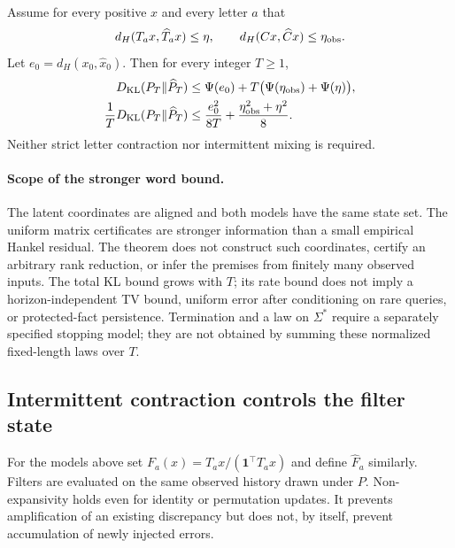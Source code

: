 \begin{theorem}
\label{II:M:thm:projective-word-kl}
Assume for every positive $x$ and every letter $a$ that
\[
 d_H(T_ax,\widehat T_ax)\le\eta,
 \qquad d_H(Cx,\widehat Cx)\le\eta_{\rm obs}.
\]
Let $e_0=d_H(x_0,\widehat x_0)$. Then for every integer $T\ge1$,
\begin{align}
 D_{\rm KL}(P_T\|\widehat P_T)
 &\le\Psi(e_0)+T\bigl(\Psi(\eta_{\rm obs})+\Psi(\eta)\bigr),
 \label{II:M:eq:word-kl-relative}\\
 \frac1T D_{\rm KL}(P_T\|\widehat P_T)
 &\le\frac{e_0^2}{8T}+\frac{\eta_{\rm obs}^2+\eta^2}{8}.
 \label{II:M:eq:word-kl-quadratic}
\end{align}
Neither strict letter contraction nor intermittent mixing is required.
\end{theorem}


\paragraph{Scope of the stronger word bound.}
The latent coordinates are aligned and both models have the same state
set. The uniform matrix certificates are stronger information than a
small empirical Hankel residual. The theorem does not construct such
coordinates, certify an arbitrary rank reduction, or infer the premises
from finitely many observed inputs. The total KL bound grows with $T$;
its rate bound does not imply a horizon-independent TV bound, uniform
error after conditioning on rare queries, or protected-fact persistence.
Termination and a law on $\Sigma^*$ require a separately specified
stopping model; they are not obtained by summing these normalized
fixed-length laws over $T$.

\subsection{Intermittent contraction controls the filter state}
For the models above set
$F_a(x)=T_ax/(\mathbf1^\top T_ax)$ and define $\widehat F_a$
similarly. Filters are evaluated on the same observed history drawn
under $P$. Non-expansivity holds even for identity or permutation
updates. It prevents amplification of an existing discrepancy but does
not, by itself, prevent accumulation of newly injected errors.

